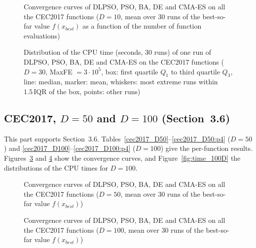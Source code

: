 \begin{figure}[!htbp]
    \centering
    \caption{Convergence curves of DLPSO, PSO, BA, DE and CMA-ES on all the CEC2017 functions ($D=10$, mean over 30 runs of the best-so-far value $f(x_{best})$ as a function of the number of function evaluations)}
    \label{cec2017_conv10}
\end{figure}

\begin{figure}[!htbp]
    \centering
        \caption{Distribution of the CPU time (seconds, 30 runs) of one run of DLPSO, PSO, BA, DE and CMA-ES on the CEC2017 functions ($D=30$, MaxFE $=3\cdot10^5$, box: first quartile $Q_1$ to third quartile $Q_3$, line: median, marker: mean, whiskers: most extreme runs within $1.5\,\mathrm{IQR}$ of the box, points: other runs)}
    \label{cec2017_time}
\end{figure}




\FloatBarrier
\subsection{CEC2017, $D=50$ and $D=100$ (Section~3.6)}\label{app:high}
This part supports Section~3.6. Tables~\ref{cec2017_D50}--\ref{cec2017_D50:p4} ($D=50$) and \ref{cec2017_D100}--\ref{cec2017_D100:p4} ($D=100$) give the per-function results. Figures~\ref{fig:convergence_50D} and \ref{fig:convergence_100D} show the convergence curves, and Figure~\ref{fig:time_100D} the distributions of the CPU times for $D=100$.


\begin{figure}[!htbp]
    \centering
    \caption{Convergence curves of DLPSO, PSO, BA, DE and CMA-ES on all the CEC2017 functions ($D=50$, mean over 30 runs of the best-so-far value $f(x_{best})$)}
    \label{fig:convergence_50D}
\end{figure}

\begin{figure}[!htbp]
    \centering
    \caption{Convergence curves of DLPSO, PSO, BA, DE and CMA-ES on all the CEC2017 functions ($D=100$, mean over 30 runs of the best-so-far value $f(x_{best})$)}
    \label{fig:convergence_100D}
\end{figure}

